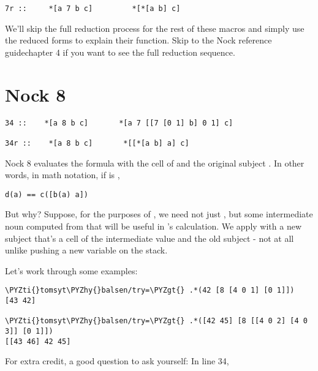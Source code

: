 \begin{framed_shaded}
\begin{Verbatim}[fontsize=\relsize{-2.5},fontseries=b,commandchars=\\\{\}]
7r ::     *[a 7 b c]         *[*[a b] c]
\end{Verbatim}
\end{framed_shaded}
We'll skip the full reduction process for the rest of these macros and simply use the reduced forms to explain their function. Skip to the Nock reference guidechapter 4 if you want to see the full reduction sequence.

\section{Nock 8}

\begin{framed_shaded}
\begin{Verbatim}[fontsize=\relsize{-2.5},fontseries=b,commandchars=\\\{\}]
34 ::    *[a 8 b c]       *[a 7 [[7 [0 1] b] 0 1] c]

34r ::    *[a 8 b c]       *[[*[a b] a] c]
\end{Verbatim}
\end{framed_shaded}

Nock 8 evaluates the formula  with the cell of \kode{*[a b]} and the original
subject .  In other words, in math notation, if  is \kode{[8 b c]},

\begin{framed_shaded}
\begin{Verbatim}[fontsize=\relsize{-2.5},fontseries=b,commandchars=\\\{\}]
d(a) == c([b(a) a])
\end{Verbatim}
\end{framed_shaded}
But why?  Suppose, for the purposes of , we need not just ,
but some intermediate noun computed from  that will be useful
in 's calculation.  We apply  with a new subject that's a
cell of the intermediate value and the old subject - not at all
unlike pushing a new variable on the stack.

Let's work through some examples:

\begin{framed_shaded}
\begin{Verbatim}[fontsize=\relsize{-2.5},fontseries=b,commandchars=\\\{\}]
\PYZti{}tomsyt\PYZhy{}balsen/try=\PYZgt{} .*(42 [8 [4 0 1] [0 1]])
[43 42]

\PYZti{}tomsyt\PYZhy{}balsen/try=\PYZgt{} .*([42 45] [8 [[4 0 2] [4 0 3]] [0 1]])
[[43 46] 42 45]
\end{Verbatim}
\end{framed_shaded}
For extra credit, a good question to ask yourself: In line 34,

